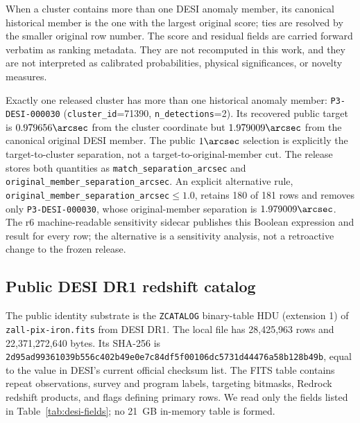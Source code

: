 \documentclass[twocolumn]{aastex701}
\begin{document}
When a cluster contains more than one DESI anomaly member, its canonical historical member is
the one with the largest original score; ties are resolved by the smaller original row number.
The score and residual fields are carried forward verbatim as ranking metadata.  They are not
recomputed in this work, and they are not interpreted as calibrated probabilities, physical
significances, or novelty measures.

Exactly one released cluster has more than one historical anomaly member:
\texttt{P3-DESI-000030} (\texttt{cluster\_id}=71390, \texttt{n\_detections}=2).  Its recovered
public target is $0.979656\arcsec$ from the cluster coordinate but $1.979009\arcsec$ from the
canonical original DESI member.  The public $1\arcsec$ selection is explicitly the target-to-cluster
separation, not a target-to-original-member cut.  The release stores both quantities as
\texttt{match\_separation\_arcsec} and \texttt{original\_member\_separation\_arcsec}.
An explicit alternative rule,
\texttt{original\_member\_separation\_arcsec}$\le1.0$, retains 180 of 181 rows and removes only
\texttt{P3-DESI-000030}, whose original-member separation is $1.979009\arcsec$.  The r6
machine-readable sensitivity sidecar publishes this Boolean expression and result for every row;
the alternative is a sensitivity analysis, not a retroactive change to the frozen release.

\subsection{Public DESI DR1 redshift catalog}\label{sec:desi-input}

The public identity substrate is the \texttt{ZCATALOG} binary-table HDU (extension 1) of
\texttt{zall-pix-iron.fits} from DESI DR1.  The local file has
28,425,963 rows and 22,371,272,640 bytes.  Its SHA-256 is
\texttt{2d95ad99361039b556c402b49e0e7c84\allowbreak df5f00106dc5731d44476a58b128b49b}, equal to the
value in DESI's current official checksum list.  The FITS table contains repeat observations,
survey and program labels, targeting bitmasks, Redrock redshift products, and flags defining
primary rows.  We read only the fields listed in Table~\ref{tab:desi-fields}; no 21~GB in-memory
table is formed.
\end{document}
